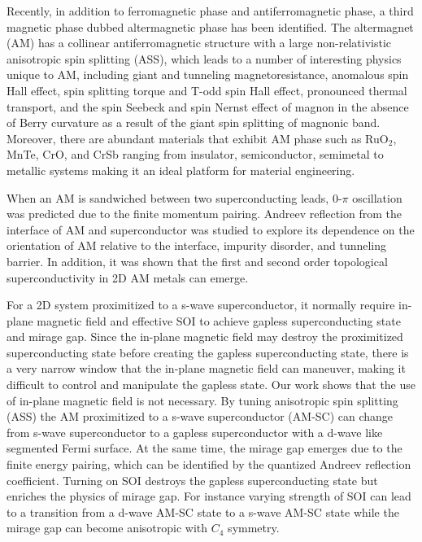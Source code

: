 \documentclass[aps, prb, twocolumn, amssymb, amsmath, showpacs, superscriptaddress]{revtex4-1}
\begin{document}
Recently, in addition to ferromagnetic phase and antiferromagnetic phase, a third magnetic phase dubbed altermagnetic phase has been identified\cite{AM0, AM1, AM2, AM3, AM4, AM5, C-Song1, Nitta, C-Song2}. The altermagnet (AM) has a collinear antiferromagnetic structure with a large non-relativistic anisotropic spin splitting (ASS), which leads to a number of interesting physics unique to AM, including giant and tunneling magnetoresistance\cite{AM1}, anomalous spin Hall effect\cite{AM4, AM6, AM7, NC1}, spin splitting torque and T-odd spin Hall effect\cite{AM5, C-Song1, Nitta, C-Song2}, pronounced thermal transport\cite{Y-Yao1}, and the spin Seebeck and spin Nernst effect of magnon in the absence of Berry curvature as a result of the giant spin splitting of magnonic band\cite{Sinova1, T-Yu}. Moreover, there are abundant materials that exhibit AM phase such as RuO$_2$, MnTe, CrO, and CrSb ranging from insulator, semiconductor, semimetal to metallic systems\cite{AM3} making it an ideal platform for material engineering\cite{Q-Liu, Y-Yao, Lovesey, Sattigeri}.

When an AM is sandwiched between two superconducting leads, $0$-$\pi$ oscillation was predicted due to the finite momentum pairing\cite{Brataas1, SB-Zhang, Beenakker}. Andreev reflection from the interface of AM and superconductor was studied to explore its dependence on the orientation of AM relative to the interface, impurity disorder, and tunneling barrier\cite{Papaj, Brataas2}. In addition, it was shown that the first and second order topological superconductivity in 2D AM metals can emerge\cite{D-Zhu,Hughes}.

For a 2D system proximitized to a s-wave superconductor, it normally require in-plane magnetic field and effective SOI to achieve gapless superconducting state and mirage gap. Since the in-plane magnetic field may destroy the proximitized superconducting state before creating the gapless superconducting state, there is a very narrow window that the in-plane magnetic field can maneuver, making it difficult to control and manipulate the gapless state.
Our work shows that the use of in-plane magnetic field is not necessary. By tuning anisotropic spin splitting (ASS) the AM proximitized to a s-wave superconductor (AM-SC) can change from s-wave superconductor to a gapless superconductor with a d-wave like segmented Fermi surface. At the same time, the mirage gap emerges due to the finite energy pairing, which can be identified by the quantized Andreev reflection coefficient. Turning on SOI destroys the gapless superconducting state but enriches the physics of mirage gap. For instance varying strength of SOI can lead to a transition from a d-wave AM-SC state to a s-wave AM-SC state while the mirage gap can become anisotropic with $C_4$ symmetry.
\end{document}

